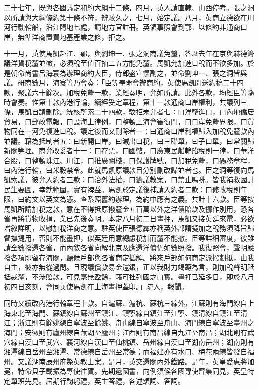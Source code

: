 \begin{pinyinscope}
二十七年，既與各國議定和約大綱十二條，四月，英人請直隸、山西停考。張之洞以所請與大綱條約第十條不符，辨駮久之，七月，始定議。八月，英商立德欲在川河行駛輪船，沿江購地七處，請地方官註冊。英領事照會到鄂，以條約非通商口岸，無準洋商置買地基產業之條，拒之。

十一月，英使馬凱赴江、鄂，與劉坤一、張之洞商議免釐，答以去年在京與赫德籌議洋貨稅釐並徵，必須稅至值百抽二五方能免釐。馬凱允加進口稅而不欲多加。於是朝命尚書呂海寰為辦理商約大臣，侍郎盛宣懷副之，並命劉坤一、張之洞皆與議。研商數月，海寰等乃會奏：「臣等奉命會辦商約，英使馬凱開送約稿二十四款，聚議六十餘次。加稅免釐一款，業經奏明，允如所請。此外各款，均經臣等隨時會奏。惟第十款內港行輪，續經妥定章程，第十一款通商口岸權利，共議列三條，馬凱自請刪除。統核所索二十四款，駮拒未允者七：曰洋鹽進口，曰內地僑居貿易，曰郵政電報，曰設海上律例，曰整頓上海會審衙門，曰口岸免釐界限，曰貨物同在一河免復進口稅。議定後而又刪除者一：曰通商口岸利權歸入加稅免釐款內並議。藉為抵制者五：曰新開口岸，曰減出口稅，曰三聯單，曰子口單，曰常關歸新關筦理。商允改妥者十一：曰存票，曰國幣，曰廣東民船輪船稅則一律，曰華洋合股，曰整頓珠江、川江，曰推廣關棧，曰保護牌號，曰加稅免釐，曰礦務章程，曰內港行輪，曰米穀禁令。此就馬凱原議款目分別刪改歸並者也。臣之洞等復向馬凱索議，彼允入約者三款：曰治外法權，曰籌議教案，曰禁止嗎啡。皆我補救國計民生要圖，幸就範圍，實有裨益。馬凱於定議後補請入約者二款：曰修改稅則年限，曰約文以英文為憑。查系照舊約辦理，為約中應有之義。共計十六款。臣等按馬凱所請加稅之款，意在不得抵原撥釐金五百萬以外之洋債賠款及挪作別用，恐各省再將貨物收捐，業已先後奏明。本定八月初二日畫押，馬凱又接英廷來電，必欲增敘詳明，以慰加稅洋商之意。駐英使臣張德彞亦稱英外部謂擬加之稅務須降旨歸督撫提用，否則不能畫押，似英廷用意總慮稅加而釐不能撤。臣等詳細審度，彼雖請全數撥還各省，而內敘各省向解北京及應還洋債仍如數照撥。我復照會，聲明應撥各項即留存海關，聽候戶部與各省商定抵解。將來戶部如何商定派撥劃抵，由我自主，彼亦無從過問。且現議償款易金還銀，正以我財力竭蹶為言，則加稅聲明祗抵裁釐，不涉賠款，可見毫無盈餘，藉可杜列國之口實。畫押已延多日，即於八月初四日亥刻，會同英使馬凱在上海畫押蓋印。」疏入，報聞。

同時又續改內港行輪章程十款。自滬蘇、滬杭、蘇杭三線外，江蘇則有海門線自上海東北至海門、蘇鎮線自蘇州至鎮江、鎮寧線自鎮江至江寧、鎮清線自鎮江至清江；浙江則有餘姚線自寧波至餘姚、舟山線自寧波至舟山、海門線自寧波至臺州之海門；安徽則有廬州線自蕪湖至廬州；江西則有南昌線自九江至南昌；湖北則有武穴線自漢口至武穴、襄河線自漢口至仙桃鎮、岳州線自漢口至湖南岳州；湖南則有湘潭線自岳州至湘潭、常德線自岳州至常德；而福建亦有水口、梅花兩線皆發自福州。又議湖南辰州府斃英教士案。是月，英交還關內外鐵路。是年，英皇愛惠將加冕，特命貝子載振為專使往賀。先期遞國書，向例須候各國專使齊集同見，英皇特定單班先見。屆期行鞠躬禮，英主答禮，各述頌詞、答詞。


\end{pinyinscope}
